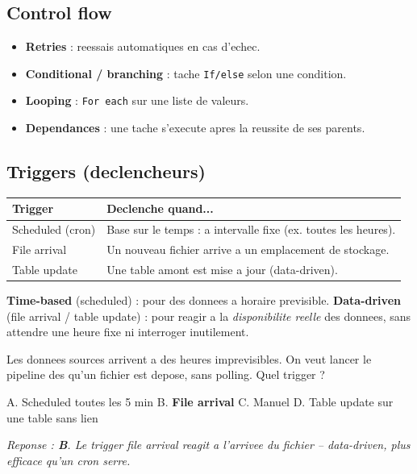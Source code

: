 \documentclass[11pt,a4paper]{article}
\begin{document}
\subsection{Control flow}

\begin{itemize}[leftmargin=*,nosep]
  \item \textbf{Retries} : reessais automatiques en cas d'echec.
  \item \textbf{Conditional / branching} : tache \texttt{If/else} selon une condition.
  \item \textbf{Looping} : \texttt{For each} sur une liste de valeurs.
  \item \textbf{Dependances} : une tache s'execute apres la reussite de ses parents.
\end{itemize}

\subsection{Triggers (declencheurs)}

\begin{center}
\renewcommand{\arraystretch}{1.3}
\begin{tabular}{@{}p{4cm}p{10.5cm}@{}}
\toprule
\textbf{Trigger} & \textbf{Declenche quand...} \\
\midrule
Scheduled (cron) & Base sur le temps : a intervalle fixe (ex. toutes les heures). \\
File arrival & Un nouveau fichier arrive a un emplacement de stockage. \\
Table update & Une table amont est mise a jour (data-driven). \\
\bottomrule
\end{tabular}
\end{center}

\begin{piege}
\textbf{Time-based} (scheduled) : pour des donnees a horaire previsible.
\textbf{Data-driven} (file arrival / table update) : pour reagir a la \emph{disponibilite
reelle} des donnees, sans attendre une heure fixe ni interroger inutilement.
\end{piege}

\begin{qcm}
Les donnees sources arrivent a des heures imprevisibles. On veut lancer le pipeline des
qu'un fichier est depose, sans polling. Quel trigger ?

\smallskip
A. Scheduled toutes les 5 min \hfill
B. \textbf{File arrival} \hfill
C. Manuel \hfill
D. Table update sur une table sans lien

\smallskip
\textit{Reponse : \textbf{B}. Le trigger file arrival reagit a l'arrivee du fichier -- data-driven,
plus efficace qu'un cron serre.}
\end{qcm}
\end{document}
